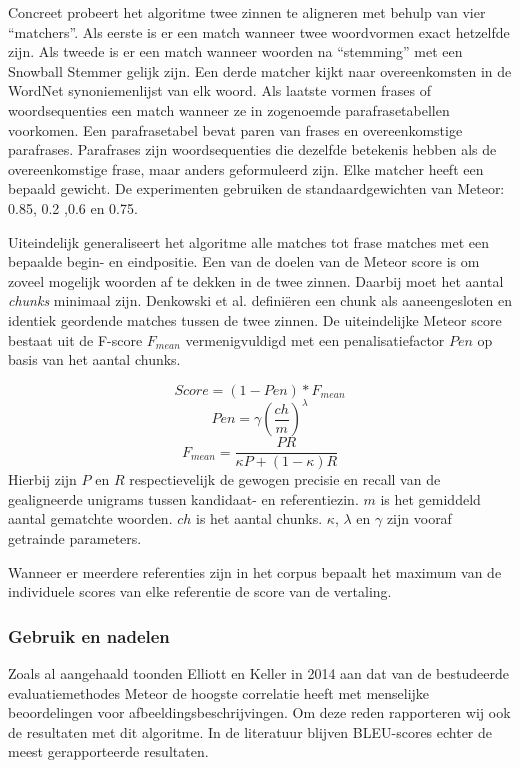 Concreet probeert het algoritme twee zinnen te aligneren met behulp van vier ``matchers''. Als eerste is er een match wanneer twee woordvormen exact hetzelfde zijn. Als tweede is er een match wanneer woorden na ``stemming'' met een Snowball Stemmer\cite{porter2001snowball} gelijk zijn. Een derde matcher kijkt naar overeenkomsten in de WordNet synoniemenlijst van elk woord\cite{Miller1990}. Als laatste vormen frases of woordsequenties een match wanneer ze in zogenoemde parafrasetabellen voorkomen. Een parafrasetabel bevat paren van frases en overeenkomstige parafrases. Parafrases zijn woordsequenties die dezelfde betekenis hebben als de overeenkomstige frase, maar anders geformuleerd zijn.
Elke matcher heeft een bepaald gewicht. De experimenten gebruiken de standaardgewichten van Meteor: 0.85, 0.2 ,0.6 en 0.75.

Uiteindelijk generaliseert het algoritme alle matches tot frase matches met een bepaalde begin- en eindpositie. Een van de doelen van de Meteor score is om zoveel mogelijk woorden af te dekken in de twee zinnen. Daarbij moet het aantal \textit{chunks} minimaal zijn. Denkowski et al. defini\"eren een chunk als aaneengesloten en identiek geordende matches tussen de twee zinnen. De uiteindelijke Meteor score bestaat uit de F-score $F_{mean}$ vermenigvuldigd met een penalisatiefactor $Pen$ op basis van het aantal chunks.


\begin{equation}
Score = (1 - Pen)*F_{mean}
\end{equation} 
\begin{equation}
Pen = \gamma (\frac{ch}{m})^\lambda 
\end{equation}
\begin{equation}
F_{mean} = \frac{PR}{\kappa P + (1- \kappa)R}
\end{equation}
Hierbij zijn $P$ en $R$ respectievelijk de gewogen precisie en recall van de gealigneerde unigrams tussen kandidaat- en referentiezin. $m$ is het gemiddeld aantal gematchte woorden. $ch$ is het aantal chunks. $\kappa$, $\lambda$ en $\gamma$ zijn vooraf getrainde parameters.

Wanneer er meerdere referenties zijn in het corpus bepaalt het maximum van de individuele scores van elke referentie de score van de vertaling.

\subsubsection{Gebruik en nadelen}
Zoals al aangehaald toonden Elliott en Keller in 2014 aan dat van de bestudeerde evaluatiemethodes Meteor de hoogste correlatie heeft met menselijke beoordelingen voor afbeeldingsbeschrijvingen. Om deze reden rapporteren wij ook de resultaten met dit algoritme. In de literatuur blijven BLEU-scores echter de meest gerapporteerde resultaten.

